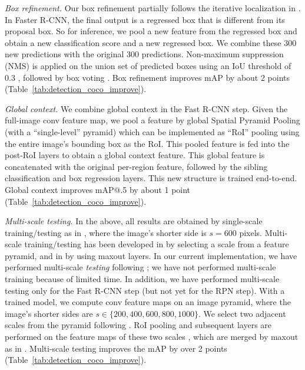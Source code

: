 \documentclass[10pt,twocolumn,letterpaper]{article}
\begin{document}
\noindent\emph{Box refinement.} Our box refinement partially follows the iterative localization in \cite{Gidaris2015}.
In Faster R-CNN, the final output is a regressed box that is different from its proposal box. So for inference, we pool a new feature from the regressed box and obtain a new classification score and a new regressed box.
We combine these 300 new predictions with the original 300 predictions. Non-maximum suppression (NMS) is applied on the union set of predicted boxes using an IoU threshold of 0.3 \cite{Girshick2014}, followed by box voting \cite{Gidaris2015}.
Box refinement improves mAP by about 2 points (Table~\ref{tab:detection_coco_improve}).

\vspace{.5em}
\noindent\emph{Global context.} We combine global context in the Fast R-CNN step. Given the full-image conv feature map, we pool a feature by global Spatial Pyramid Pooling \cite{He2014} (with a ``single-level'' pyramid) which can be implemented as ``RoI'' pooling using the entire image's bounding box as the RoI. This pooled feature is fed into the post-RoI layers to obtain a global context feature. This global feature is concatenated with the original per-region feature, followed by the sibling classification and box regression layers. This new structure is trained end-to-end.
Global context improves mAP@.5 by about 1 point (Table~\ref{tab:detection_coco_improve}).

\vspace{.5em}
\noindent\emph{Multi-scale testing.} In the above, all results are obtained by single-scale training/testing as in \cite{Ren2015}, where the image's shorter side is $s=600$ pixels. Multi-scale training/testing has been developed in \cite{He2014,Girshick2015} by selecting a scale from a feature pyramid, and in \cite{Ren2015a} by using maxout layers. In our current implementation, we have performed multi-scale \emph{testing} following \cite{Ren2015a}; we have not performed multi-scale training because of limited time. In addition, we have performed multi-scale testing only for the Fast R-CNN step (but not yet for the RPN step).
With a trained model, we compute conv feature maps on an image pyramid, where the image's shorter sides are $s\in\{200, 400, 600, 800, 1000\}$. We select two adjacent scales from the pyramid following \cite{Ren2015a}. RoI pooling and subsequent layers are performed on the feature maps of these two scales \cite{Ren2015a}, which are merged by maxout as in \cite{Ren2015a}.
Multi-scale testing improves the mAP by over 2 points (Table~\ref{tab:detection_coco_improve}).
\end{document}
